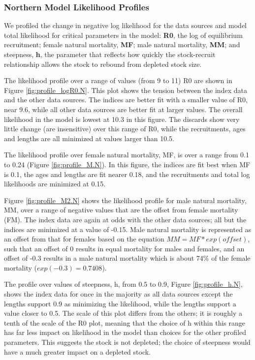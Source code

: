 \documentclass[12pt,]{article}
\begin{document}
\subsubsection{Northern Model Likelihood
Profiles}\label{northern-model-likelihood-profiles}

We profiled the change in negative log likelihood for the data sources
and model total likelihood for critical parameters in the model:
\textbf{R0}, the log of equilibrium recruitment; female natural
mortality, \textbf{MF}; male natural mortality, \textbf{MM}; and
steepness, \textbf{h}, the parameter that reflects how quickly the
stock-recruit relationship allows the stock to rebound from depleted
stock size.

The likelihood profile over a range of values (from 9 to 11) R0 are
shown in Figure \ref{fig:profile_logR0.N}. This plot shows the tension
between the index data and the other data sources. The indices are
better fit with a smaller value of R0, near 9.6, while all other data
sources are better fit at larger values. The overall likelihood in the
model is lowest at 10.3 in this figure. The discards show very little
change (are insensitive) over this range of R0, while the recruitments,
ages and lengths are all minimized at values larger than 10.5.

The likelihood profile over female natural mortality, MF, is over a
range from 0.1 to 0.24 (Figure \ref{fig:profile_M.N}). In this figure,
the indices are fit best when MF is 0.1, the ages and lengths are fit
nearer 0.18, and the recruitments and total log likelihoods are
minimized at 0.15.

Figure \ref{fig:profile_M2.N} shows the likelihood profile for male
natural mortality, MM, over a range of negative values that are the
offset from female mortality (FM). The index data are again at odds with
the other data sources; all but the indices are minimized at a value of
-0.15. Male natural mortality is represented as an offset from that for
females based on the equation \(MM = MF*exp(offset)\), such that an
offset of 0 results in equal mortality for males and females, and an
offset of -0.3 results in a male natural mortality which is about 74\%
of the female mortality (\(exp(-0.3) = 0.7408\)).

The profile over values of steepness, h, from 0.5 to 0.9, Figure
\ref{fig:profile_h.N}, shows the index data for once in the majority as
all data sources except the lengths support 0.9 as minimizing the
likelihood, while the lengths support a value closer to 0.5. The scale
of this plot differs from the others; it is roughly a tenth of the scale
of the R0 plot, meaning that the choice of h within this range has far
less impact on likelihood in the model than choices for the other
profiled parameters. This suggests the stock is not depleted; the choice
of steepness would have a much greater impact on a depleted stock.
\end{document}
